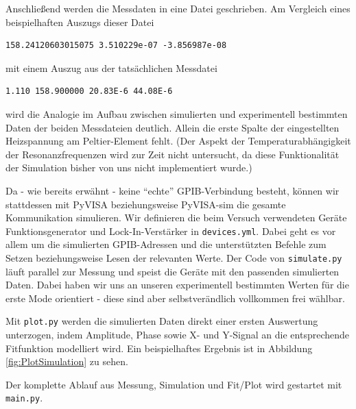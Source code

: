 Anschließend werden die Messdaten in eine Datei geschrieben. Am Vergleich eines beispielhaften Auszugs dieser Datei
\begin{small}
\begin{lstlisting}[xleftmargin=10mm,numbers=none]
158.24120603015075 3.510229e-07 -3.856987e-08
\end{lstlisting}
\end{small}

mit einem Auszug aus der tatsächlichen Messdatei
\begin{small}
\begin{lstlisting}[xleftmargin=10mm,numbers=none]
1.110 158.900000 20.83E-6 44.08E-6
\end{lstlisting}
\end{small}

wird die Analogie im Aufbau zwischen simulierten und experimentell bestimmten Daten der beiden Messdateien deutlich.
Allein die erste Spalte der eingestellten Heizspannung am Peltier-Element fehlt.
(Der Aspekt der Temperaturabhängigkeit der Resonanzfrequenzen wird zur Zeit nicht untersucht, da diese Funktionalität der Simulation bisher von uns nicht implementiert wurde.)

Da - wie bereits erwähnt - keine \enquote{echte} GPIB-Verbindung besteht, können wir stattdessen mit PyVISA beziehungsweise PyVISA-sim die gesamte Kommunikation simulieren.
Wir definieren die beim Versuch verwendeten Geräte Funktionsgenerator und Lock-In-Verstärker in \texttt{devices.yml}.
Dabei geht es vor allem um die simulierten GPIB-Adressen und die unterstützten Befehle zum Setzen beziehungsweise Lesen der relevanten Werte.
Der Code von \texttt{simulate.py} läuft parallel zur Messung und speist die Geräte mit den passenden simulierten Daten.
Dabei haben wir uns an unseren experimentell bestimmten Werten für die erste Mode orientiert - diese sind aber selbstverändlich vollkommen frei wählbar.

Mit \texttt{plot.py} werden die simulierten Daten direkt einer ersten Auswertung unterzogen, indem Amplitude, Phase sowie X- und Y-Signal an die entsprechende Fitfunktion modelliert wird.
Ein beispielhaftes Ergebnis ist in Abbildung \ref{fig:PlotSimulation} zu sehen.

Der komplette Ablauf aus Messung, Simulation und Fit/Plot wird gestartet mit \texttt{main.py}.

